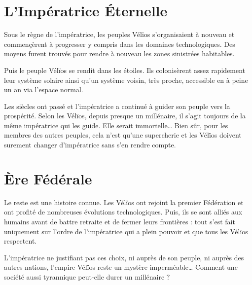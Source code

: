 \begin{multicols*}{2}
\section{L’Impératrice Éternelle}

 Sous le règne de l’impératrice, les peuples Vélïos s’organisaient à nouveau et commençèrent à progresser y compris dans les domaines technologiques. Des moyens furent trouvés pour rendre à nouveau les zones sinistrées habitables.

Puis le peuple Vélïos se rendit dans les étoiles. Ils colonisèrent assez rapidement leur système solaire ainsi qu’un système voisin, très proche, accessible en à peine un an via l’espace normal.

Les siècles ont passé et l’impératrice a continué à guider son peuple vers la prospérité.  Selon les Vélïos, depuis presque un millénaire, il s’agit toujours de la même impératrice qui les guide. Elle serait immortelle… Bien sûr, pour les membres des autres peuples, cela n’est qu’une supercherie et les Vélïos doivent surement changer d’impératrice sans s’en rendre compte.

\section{Ère Fédérale}

Le reste est une histoire connue. Les Vélïos ont rejoint la premier Fédération et ont profité de nombreuses évolutions technologiques. Puis, ils se sont alliés aux humains avant de battre retraite et de fermer leurs frontières : tout s’est fait uniquement sur l’ordre de l’impératrice qui a plein pouvoir et que tous les Vélïos respectent.

L’impératrice ne justifiant pas ces choix, ni auprès de son peuple, ni auprès des autres nations, l’empire Vélïos reste un mystère imperméable… Comment une société aussi tyrannique peut-elle durer un millénaire ?

\end{multicols*}
